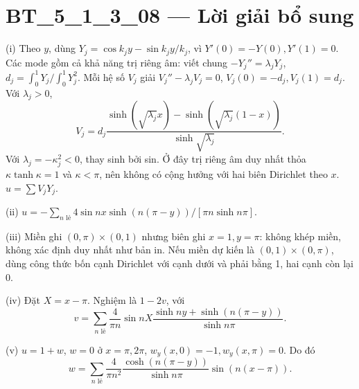 \documentclass[10pt,a4paper]{article}
\begin{document}
\section*{BT\_5\_1\_3\_08 — Lời giải bổ sung}
(i) Theo $y$, dùng $Y_j=\cos k_jy-\sin k_jy/k_j$, vì $Y'(0)=-Y(0),Y'(1)=0$. Các mode gồm cả khả năng trị riêng âm: viết chung $-Y_j''=\lambda_jY_j$, $d_j=\int_0^1Y_j/\int_0^1Y_j^2$. Mỗi hệ số $V_j$ giải $V_j''-\lambda_jV_j=0$, $V_j(0)=-d_j,V_j(1)=d_j$. Với $\lambda_j>0$,
\[V_j=d_j\frac{\sinh(\sqrt{\lambda_j}x)-\sinh(\sqrt{\lambda_j}(1-x))}{\sinh\sqrt{\lambda_j}}.\]
Với $\lambda_j=-\kappa_j^2<0$, thay sinh bởi sin. Ở đây trị riêng âm duy nhất thỏa $\kappa\tanh\kappa=1$ và $\kappa<\pi$, nên không có cộng hưởng với hai biên Dirichlet theo $x$. $u=\sum V_jY_j$.

(ii) $u=-\sum_{n\text{ lẻ}}4\sin nx\sinh(n(\pi-y))/[\pi n\sinh n\pi]$.

(iii) Miền ghi $(0,\pi)\times(0,1)$ nhưng biên ghi $x=1,y=\pi$: không khép miền, không xác định duy nhất như bản in. Nếu miền dự kiến là $(0,1)\times(0,\pi)$, dùng công thức bốn cạnh Dirichlet với cạnh dưới và phải bằng 1, hai cạnh còn lại 0.

(iv) Đặt $X=x-\pi$. Nghiệm là $1-2v$, với
\[v=\sum_{n\text{ lẻ}}\frac4{\pi n}\sin nX\frac{\sinh ny+\sinh(n(\pi-y))}{\sinh n\pi}.\]

(v) $u=1+w$, $w=0$ ở $x=\pi,2\pi$, $w_y(x,0)=-1,w_y(x,\pi)=0$. Do đó
\[w=\sum_{n\text{ lẻ}}\frac4{\pi n^2}\frac{\cosh(n(\pi-y))}{\sinh n\pi}\sin(n(x-\pi)).\]
\end{document}

